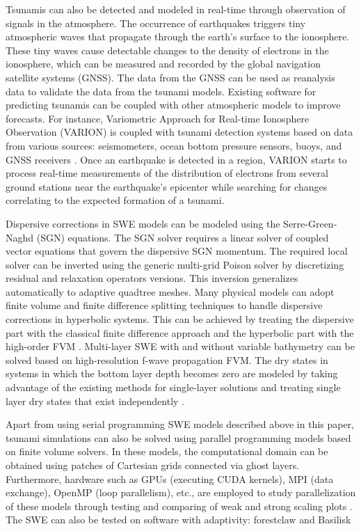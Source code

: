 \documentclass[10pt,a4paper]{article}
\begin{document}
	
	Tsunamis can also be detected and modeled in real-time through observation of signals in the atmosphere. The occurrence of earthquakes triggers tiny atmospheric waves that propagate through the earth's surface to the ionosphere. These tiny waves cause detectable changes to the density of electrons in the ionosphere, which can be measured and recorded by the global navigation satellite systems (GNSS).  The data from the GNSS can be used as reanalysis data to validate the data from the tsunami models. Existing software for predicting tsunamis can be coupled with other atmospheric models to improve forecasts. For instance, Variometric Approach for Real-time Ionosphere Observation (VARION)  is coupled with tsunami detection systems based on data from various sources: seismometers, ocean bottom pressure sensors, buoys, and GNSS receivers \citep{savastano2017real}. Once an earthquake is detected in a region, VARION starts to process real-time measurements of the distribution of electrons from several ground stations near the earthquake's epicenter while searching for changes correlating to the expected formation of a tsunami.
	
	
	Dispersive corrections in SWE models can be modeled using the Serre-Green-Naghd (SGN) equations. The SGN solver requires a linear solver of coupled vector equations that govern the dispersive SGN momentum.  The required local solver can be inverted using the generic multi-grid Poison solver by discretizing residual and relaxation operators versions. This inversion generalizes automatically to adaptive quadtree meshes. Many physical models can adopt finite volume and finite difference splitting techniques to handle dispersive corrections in hyperbolic systems.  This can be achieved by treating the dispersive part with the classical finite difference approach and the hyperbolic part with the high-order FVM \citep{la-bo:2009,po:2020,po:2015}. 
	Multi-layer SWE with and without variable bathymetry can be solved based on high-resolution f-wave propagation FVM. The dry states in systems in which the bottom layer depth becomes zero are modeled by taking advantage of the existing methods for single-layer solutions and treating single layer dry states that exist independently \citep{mandli2013numerical}.
	
	Apart from using serial programming SWE models described above in this paper, tsunami simulations can also be solved using parallel programming models based on finite volume solvers.  In these models, the computational domain can be obtained using patches of Cartesian grids connected via ghost layers.  Furthermore, hardware such as GPUs (executing CUDA kernels), MPI (data exchange), OpenMP (loop parallelism), etc., are employed to study parallelization of these models through testing and comparing of weak and strong scaling plots \citep{qi-le-mo:2018}.  The SWE can also be tested on software with adaptivity: forestclaw \citep{ca-bu:2017} and  Basilisk \citep{po:2015}
	
	
	
	
	
	
	
	
	
\end{document}
